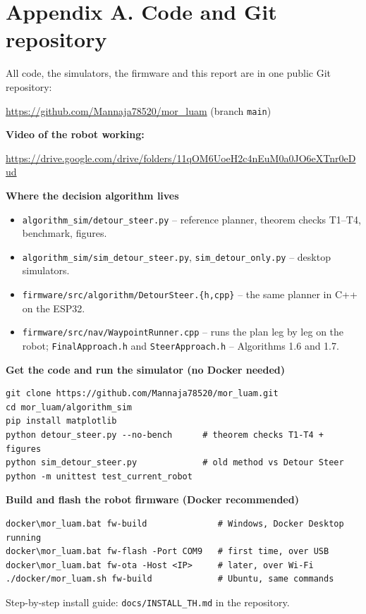 \documentclass[11pt,a4paper]{article}
\begin{document}
\clearpage
\section*{Appendix A. Code and Git repository}
All code, the simulators, the firmware and this report are in one public Git repository:

\begin{center}
\url{https://github.com/Mannaja78520/mor_luam} \quad (branch \texttt{main})
\end{center}

\noindent\textbf{Video of the robot working:}
\begin{center}
\url{https://drive.google.com/drive/folders/11qOM6UoeH2c4nEuM0a0JO6eXTnr0eDud}
\end{center}
\par\medskip

\noindent\textbf{Where the decision algorithm lives}
\begin{itemize}
\item \texttt{algorithm\_sim/detour\_steer.py} -- reference planner, theorem checks T1--T4, benchmark, figures.
\item \texttt{algorithm\_sim/sim\_detour\_steer.py}, \texttt{sim\_detour\_only.py} -- desktop simulators.
\item \texttt{firmware/src/algorithm/DetourSteer.\{h,cpp\}} -- the same planner in C++ on the ESP32.
\item \texttt{firmware/src/nav/WaypointRunner.cpp} -- runs the plan leg by leg on the robot;
\texttt{FinalApproach.h} and \texttt{SteerApproach.h} -- Algorithms 1.6 and 1.7.
\end{itemize}

\noindent\textbf{Get the code and run the simulator (no Docker needed)}
\begin{lstlisting}[numbers=none]
git clone https://github.com/Mannaja78520/mor_luam.git
cd mor_luam/algorithm_sim
pip install matplotlib
python detour_steer.py --no-bench      # theorem checks T1-T4 + figures
python sim_detour_steer.py             # old method vs Detour Steer
python -m unittest test_current_robot
\end{lstlisting}

\noindent\textbf{Build and flash the robot firmware (Docker recommended)}
\begin{lstlisting}[numbers=none]
docker\mor_luam.bat fw-build              # Windows, Docker Desktop running
docker\mor_luam.bat fw-flash -Port COM9   # first time, over USB
docker\mor_luam.bat fw-ota -Host <IP>     # later, over Wi-Fi
./docker/mor_luam.sh fw-build             # Ubuntu, same commands
\end{lstlisting}
Step-by-step install guide: \texttt{docs/INSTALL\_TH.md} in the repository.
\end{document}
